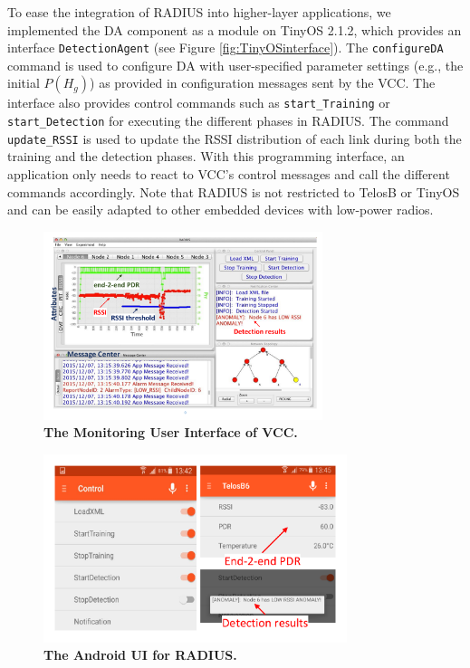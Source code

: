 To ease the integration of RADIUS into higher-layer applications, we implemented the DA component as a module on TinyOS 2.1.2, which provides an interface \texttt{DetectionAgent} (see Figure \ref{fig:TinyOSinterface}). The \texttt{configureDA} command is used to configure DA with user-specified parameter settings (e.g., the initial $P(H_g)$) as provided in configuration messages sent by the VCC. The interface also provides control commands such as \texttt{start\_Training} or \texttt{start\_Detection} for executing the different phases in RADIUS. The command \texttt{update\_RSSI} is used to update the RSSI distribution of each link during both the training and the detection phases. With this programming interface, an application only needs to react to VCC's control messages and call the different commands accordingly. Note that RADIUS is not restricted to TelosB or TinyOS and can be easily adapted to other embedded devices with low-power radios.



\begin{figure}[t]
	\centering
	\includegraphics[width=1\linewidth, height = 5.5cm]{Radius-GUI}
	\vspace{-0.9cm}
	\caption{\textbf{The Monitoring User Interface of VCC.}}
	\label{fig:GUI}
	\vspace{-0.7cm}
\end{figure}


\begin{figure}[t]
	\centering
	\includegraphics[width=1\linewidth, height = 5.5cm]{IOT-interface}
	\vspace{-0.9cm}
	\caption{\textbf{The Android UI for RADIUS.}}
	\label{fig:IOT}
	\vspace{-0.7cm}
\end{figure}

